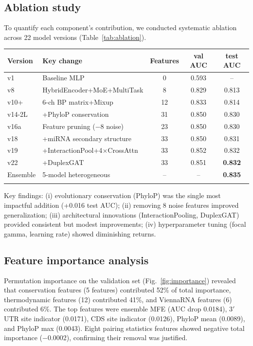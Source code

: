 \documentclass[unnumsec,webpdf,contemporary,large]{oup-authoring-template}
\begin{document}
\subsection{Ablation study}

To quantify each component's contribution, we conducted systematic ablation across 22 model versions (Table~\ref{tab:ablation}).

\begin{table}[!t]
{\begin{tabular}{@{}llccc@{}}
\toprule
Version & Key change & Features & val AUC & test AUC \\
\midrule
v1 & Baseline MLP & 0 & 0.593 & -- \\
v8 & HybridEncoder+MoE+MultiTask & 8 & 0.829 & 0.813 \\
v10+ & 6-ch BP matrix+Mixup & 12 & 0.833 & 0.814 \\
v14-2L & +PhyloP conservation & 31 & 0.850 & 0.830 \\
v16a & Feature pruning ($-$8 noise) & 23 & 0.850 & 0.830 \\
v18 & +miRNA secondary structure & 33 & 0.850 & 0.831 \\
v19 & +InteractionPool+4$\times$CrossAttn & 33 & 0.852 & 0.832 \\
v22 & +DuplexGAT & 33 & 0.851 & \textbf{0.832} \\
\midrule
Ensemble & 5-model heterogeneous & -- & -- & \textbf{0.835} \\
\botrule
\end{tabular}}{}
\end{table}

Key findings: (i) evolutionary conservation (PhyloP) was the single most impactful addition (+0.016 test AUC); (ii) removing 8 noise features improved generalization; (iii) architectural innovations (InteractionPooling, DuplexGAT) provided consistent but modest improvements; (iv) hyperparameter tuning (focal gamma, learning rate) showed diminishing returns.

\subsection{Feature importance analysis}

Permutation importance on the validation set (Fig.~\ref{fig:importance}) revealed that conservation features (5 features) contributed 52\% of total importance, thermodynamic features (12) contributed 41\%, and ViennaRNA features (6) contributed 6\%. The top features were ensemble MFE (AUC drop 0.0184), 3$'$UTR site indicator (0.0171), CDS site indicator (0.0126), PhyloP mean (0.0089), and PhyloP max (0.0043). Eight pairing statistics features showed negative total importance ($-$0.0002), confirming their removal was justified.
\end{document}
